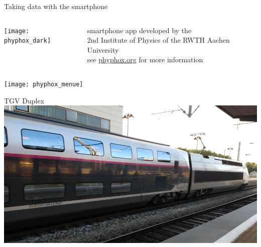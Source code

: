 \documentclass[svgnames]{beamer}
\begin{document}
\begin{frame}{Taking data with the smartphone}

 \begin{columns}
  \begin{column}{0.3\textwidth}
   \texttt{[image: phyphox\_dark]}
  \end{column}%
  \begin{column}{0.7\textwidth}%
   \begin{small}%
    smartphone app developed by the\\
    2nd Institute of Physics of the RWTH Aachen University\\
    see \url{phyphox.org} for more information
   \end{small}
  \end{column}
 \end{columns}

 \vspace{0.7truecm}
 \texttt{[image: phyphox\_menue]}\qquad%
\end{frame}

\begin{frame}{TGV Duplex}
 \includegraphics[width=\textwidth]{tgv-duplex}
\end{frame}
\end{document}
